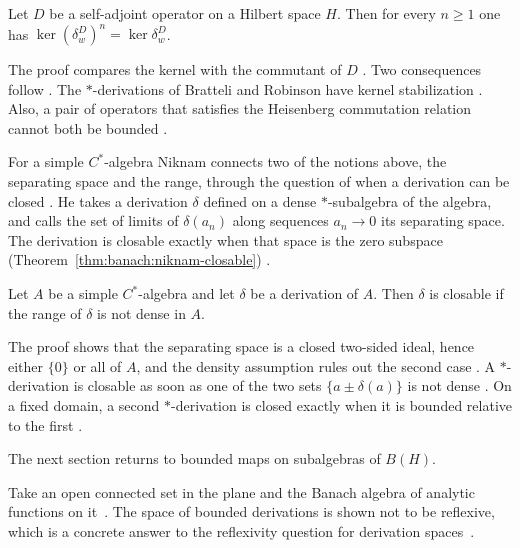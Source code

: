 \begin{theorem}\label{thm:banach:kernel-stabilization}
Let $D$ be a self-adjoint operator on a Hilbert space $H$. Then for every
$n\geq 1$ one has $\ker(\delta_{w}^{D})^{n}=\ker\delta_{w}^{D}$.
\end{theorem}

The proof compares the kernel with the commutant of $D$
\cite[p.~7]{Ismert2018Kernel}. Two consequences follow
\cite[p.~7]{Ismert2018Kernel}. The $*$-derivations of Bratteli and Robinson
have kernel stabilization \cite[p.~8]{Ismert2018Kernel}. Also, a pair of
operators that satisfies the Heisenberg commutation relation cannot both be
bounded \cite[p.~8]{Ismert2018Kernel}.

For a simple $C^*$-algebra Niknam connects two of the notions above, the
separating space and the range, through the question of when a derivation can be closed
\cite[p.~181]{Niknam1983Closable}. He takes a derivation $\delta$ defined on a
dense $*$-subalgebra of the algebra, and calls the set of limits of
$\delta(a_n)$ along sequences $a_n\to0$ its separating space. The derivation
is closable exactly when that space is the zero subspace (Theorem~\ref{thm:banach:niknam-closable})
\cite[p.~181]{Niknam1983Closable}.\begin{theorem}\label{thm:banach:niknam-closable}
Let $A$ be a simple $C^*$-algebra and let $\delta$ be a derivation of $A$. Then
$\delta$ is closable if the range of $\delta$ is not dense in $A$.
\end{theorem}

The proof shows that the separating space is a closed two-sided ideal, hence
either $\{0\}$ or all of $A$, and the density assumption rules out the second
case \cite[p.~182]{Niknam1983Closable}. A $*$-derivation is closable as soon
as one of the two sets $\{a\pm\delta(a)\}$ is not dense \cite[Corollary~2,
p.~182]{Niknam1983Closable}. On a fixed domain, a second $*$-derivation is
closed exactly when it is bounded relative to the first \cite[Theorem~3,
p.~182]{Niknam1983Closable}.

The next section returns to bounded maps on subalgebras of $B(H)$.

Take an open connected set in the plane and the Banach algebra of analytic
functions on it~\cite{WlNonReflexivityOfTheDerivationS2019}. The space of bounded derivations is shown not to be
reflexive, which is a concrete answer to the reflexivity question for
derivation spaces~\cite{WlNonReflexivityOfTheDerivationS2019}.


